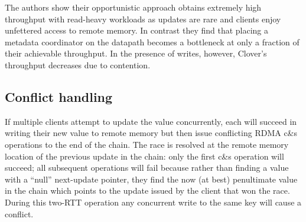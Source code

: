
The authors show their opportunistic approach obtains extremely high
throughput with read-heavy workloads as updates are rare and clients
enjoy unfettered access to remote memory. In contrast they find that
placing a metadata coordinator on the datapath becomes a bottleneck at
only a fraction of their achievable throughput.  In the presence of
writes, however, Clover's throughput decreases due to contention.

\subsection{Conflict handling}

If multiple clients attempt to update the value concurrently, each
will succeed in writing their new value to remote memory but then
issue conflicting RDMA c\&s operations to the end of the chain.  The
race is resolved at the remote memory location of the previous update
in the chain: only the first c\&s operation will succeed; all
subsequent operations will fail because rather than finding a value
with a ``null'' next-update pointer, they find the now (at best)
penultimate value in the chain which points to the update issued by
the client that won the race.
During this
two-RTT operation any concurrent write to the same key will cause a
conflict.



